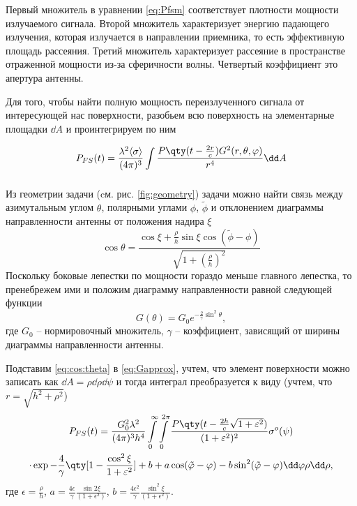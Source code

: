 Первый множитель в уравнении  \eqref{eq:Pfsm}  соответствует плотности мощности
излучаемого сигнала. Второй множитель характеризует энергию падающего
излучения, которая излучается в направлении приемника, то есть эффективную
площадь рассеяния. Третий множитель
характеризует рассеяние в пространстве отраженной мощности из-за
сферичности волны. Четвертый
коэффициент это апертура антенны.



Для того, чтобы найти полную мощность переизлученного сигнала от интересующей
нас поверхности,
разобьем всю поверхность на элементарные площадки $\dd A$ и проинтегрируем
по ним 

\begin{equation}
    P_{FS}(t) = \frac{\lambda^2\mean{\sigma}}{(4 \pi)^3 } \int\limits_{} 
    \frac
        {P\qty(t - \frac{2r}{c}) G^2(r,\theta,\phi) }
        {r^4} 
    \dd A
\end{equation}

 Из геометрии задачи (cм. рис. \ref{fig:geometry}) задачи можно найти связь между
 азимутальным углом $\theta$, полярными углами  $\phi$,  $\tilde \phi$ и
 отклонением диаграммы направленности антенны от положения надира $\xi$
 \begin{equation}
     \label{eq:cos:theta}
     \cos \theta = 
     \frac{\cos \xi + \frac{\rho}{h} \sin \xi \cos(\tilde \phi - \phi)}{\sqrt{1
     + (\frac{\rho}{h})^2}}
 \end{equation}
 Поскольку боковые лепестки по мощности гораздо меньше главного лепестка, то
 пренебрежем ими и положим диаграмму направленности   равной следующей функции
 \begin{equation}
     \label{eq:Gapprox}
     G(\theta) = G_0 e^{-\frac{2}{\gamma} \sin^2 \theta},
 \end{equation}
 где $G_0$ -- нормировочный множитель,  $\gamma$ -- коэффициент, зависящий от
 ширины диаграммы направленности антенны.

 Подставим \eqref{eq:cos:theta} в \eqref{eq:Gapprox}, учтем, что  элемент
 поверхности можно записать как $\dd A = \rho \dd \rho \dd \psi$ и тогда
 интеграл преобразуется к виду  (учтем, что \newline$r = \sqrt{h^{2} + \rho^{2}}$)
 \begin{multline}
     P_{FS}(t) = \frac{G_0^2 \lambda^2}{(4 \pi)^3 h^4}
     \int\limits_{0}^{\infty} \int\limits_{0}^{2 \pi}   
     \frac{P\qty(t - \frac{2h}{c}\sqrt{1+ \epsilon^2})}{(1+\epsilon^2)^2} \sigma^o(\psi)
     \\
     \cdot \exp{-\frac{4}{\gamma} \qty[1 - \frac{\cos^2 \xi}{1+ \epsilon^2}] + b
     + a\cos(\tilde \phi - \phi) - b \sin^2(\tilde \phi - \phi)} \dd \phi \rho
     \dd \rho,
 \end{multline}
 где 
 $\displaystyle \epsilon = \frac{\rho}{h}$,
 $\displaystyle a = \frac{4\epsilon}{\gamma} \frac{\sin 2 \xi}{(1+ \epsilon^2)}$,
 $\displaystyle b= \frac{4\epsilon^2}{\gamma} \frac{\sin^2 \xi}{(1+\epsilon^2)}$.

